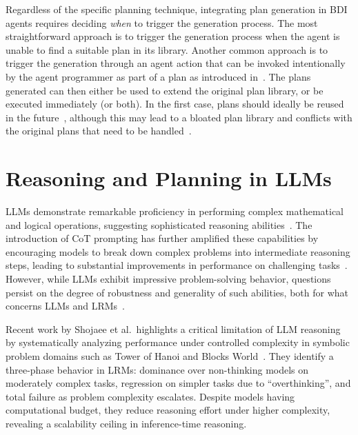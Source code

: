 \documentclass[12pt,a4paper,openright,twoside]{book}
\begin{document}
Regardless of the specific planning technique, integrating plan generation in \ac{BDI} agents requires deciding \emph{when} to trigger the generation process.
%
The most straightforward approach is to trigger the generation process when the agent is unable to find a suitable plan in its library.
%
Another common approach is to trigger the generation through an agent action that can be invoked intentionally by the agent programmer as part of a plan as introduced in~\cite{meneguzzi2008dalt}.
%
The plans generated can then either be used to extend the original plan library, or be executed immediately (or both).
%
In the first case, plans should ideally be reused in the future~\cite{silva2009atal}, although this may lead to a bloated plan library and conflicts with the original plans that need to be handled~\cite{cardoso2019emas}.

\section{Reasoning and Planning in LLMs}

LLMs demonstrate remarkable proficiency in performing complex mathematical and logical operations, suggesting sophisticated reasoning abilities~\cite{huangReasoningLargeLanguage2023}.
%
The introduction of \ac{CoT} prompting has further amplified these capabilities by encouraging models to break down complex problems into intermediate reasoning steps, leading to substantial improvements in performance on challenging tasks~\cite{weiChainofThoughtPromptingElicits2023, kojimaLargeLanguageModels2023}.
%
However, while LLMs exhibit impressive problem-solving behavior, questions persist on the degree of robustness and generality of such abilities, both for what concerns \acp{LLM} and \acp{LRM}~\cite{mccoyEmbersAutoregressionUnderstanding2023, mccoyWhenLanguageModel2024, wuReasoningRecitingExploring2024}. 

Recent work by Shojaee et al.\ highlights a critical limitation of \ac{LLM} reasoning by systematically analyzing performance under controlled complexity in symbolic problem domains such as Tower of Hanoi and Blocks World~\cite{shojaeeIllusionThinkingUnderstanding}.
%
They identify a three-phase behavior in \acp{LRM}: dominance over non-thinking models on moderately complex tasks, regression on simpler tasks due to ``overthinking'', and total failure as problem complexity escalates. Despite models having computational budget, they reduce reasoning effort under higher complexity, revealing a scalability ceiling in inference-time reasoning.
\end{document}
